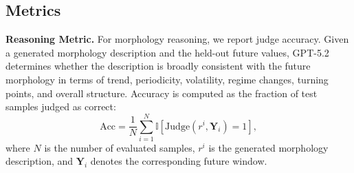 \documentclass[11pt]{article}
\newcommand{\minisection}[1]{\vspace{5pt}\noindent\textbf{#1.}}
\begin{document}
\begin{table}[htbp]
\centering
\caption{Official Time-IMM datasets, irregularity categories, and query horizons. $^\dagger$Excluded following TiMi to ensure a consistent comparison protocol. $^\ddagger$Excluded due to overlap with training data.}
\label{tab:timeimm_datasets}
\end{table}

\subsection{Metrics}

\minisection{Reasoning Metric}
For morphology reasoning, we report judge accuracy.
Given a generated morphology description and the held-out future values, GPT-5.2~\citep{singh2025openai} determines whether the description is broadly consistent with the future morphology in terms of trend, periodicity, volatility, regime changes, turning points, and overall structure.
Accuracy is computed as the fraction of test samples judged as correct:
\begin{equation}
    \mathrm{Acc}
    =
    \frac{1}{N}
    \sum_{i=1}^{N}
    \mathbb{I}\!\left[\mathrm{Judge}(r^i,\mathbf{Y}_i)=1\right],
\end{equation}
where $N$ is the number of evaluated samples, $r^i$ is the generated morphology description, and $\mathbf{Y}_i$ denotes the corresponding future window.
\end{document}
